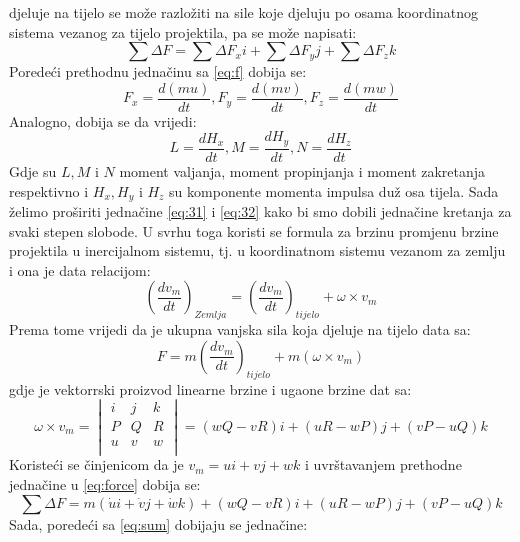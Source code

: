 djeluje na tijelo se može razložiti na sile koje djeluju po osama koordinatnog sistema 
vezanog za tijelo projektila, pa se može napisati:
\begin{equation}
    \sum \Delta F=\sum \Delta  F_xi+\sum \Delta  F_yj+\sum \Delta  F_zk
    \label{eq:sum}
\end{equation}
Poredeći prethodnu jednačinu sa \ref{eq:f} dobija se:
\begin{equation}
    F_x=\frac{d(mu)}{dt}, F_y=\frac{d(mv)}{dt}, F_z=\frac{d(mw)}{dt}
    \label{eq:31}
\end{equation}
Analogno, dobija se da vrijedi:
\begin{equation}
    L=\frac{dH_x}{dt},M=\frac{dH_y}{dt},N=\frac{dH_z}{dt}
    \label{eq:32}
\end{equation}
Gdje su $L,M$ i $N$ moment valjanja, moment propinjanja i moment zakretanja respektivno i 
$H_x, H_y$ i $H_z$ su komponente momenta impulsa duž osa tijela. 
Sada želimo proširiti jednačine \ref{eq:31} i \ref{eq:32} kako bi smo dobili 
jednačine kretanja za svaki stepen slobode. U svrhu toga koristi se formula za 
brzinu promjenu brzine projektila u inercijalnom sistemu, tj. u koordinatnom sistemu 
vezanom za zemlju i ona je data relacijom:
\begin{equation}
    \left( \frac{dv_m}{dt}\right)_{Zemlja}=\left(\frac{dv_m}{dt}\right)_{tijelo}+\omega \times v_m
\end{equation}
Prema tome vrijedi da je ukupna vanjska sila koja djeluje na tijelo data sa:
\begin{equation}
    F=m\left(\frac{dv_m}{dt}\right)_{tijelo}+m(\omega \times v_m)
    \label{eq:force}
\end{equation}
gdje je vektorrski proizvod linearne brzine i ugaone brzine dat sa:
\begin{equation}
    \omega \times v_m=\begin{vmatrix}
        i&j&k\\
        P&Q&R\\
        u&v&w\\
    \end{vmatrix}=(wQ-vR)i+(uR-wP)j+(vP-uQ)k
\end{equation}
Koristeći se činjenicom da je $v_m=ui+vj+wk$ i uvrštavanjem prethodne jednačine u \ref{eq:force} dobija se:
\begin{equation}
    \sum \Delta F=m(\dot{u}i+\dot{v}j+\dot{w}k)+(wQ-vR)i+(uR-wP)j+(vP-uQ)k
\end{equation}
Sada, poredeći sa \ref{eq:sum} dobijaju se jednačine:
